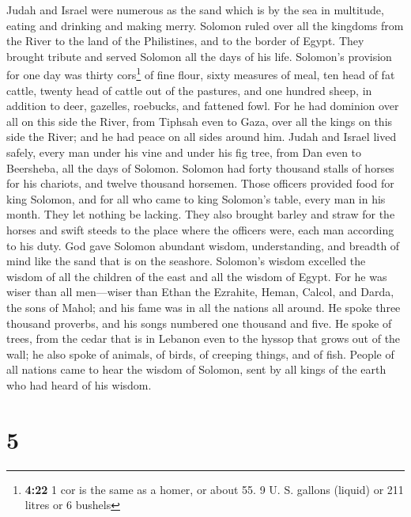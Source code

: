  Judah and Israel were numerous as the sand which is by
the sea in multitude, eating and drinking and making merry.
 Solomon ruled over all the kingdoms from the River to
the land of the Philistines, and to the border of Egypt. They brought
tribute and served Solomon all the days of his life. 
Solomon's provision for one day was thirty cors\footnote{\textbf{4:22} 1
  cor is the same as a homer, or about 55. 9 U. S. gallons (liquid) or
  211 litres or 6 bushels} of fine flour, sixty measures of meal,
 ten head of fat cattle, twenty head of cattle out of the
pastures, and one hundred sheep, in addition to deer, gazelles,
roebucks, and fattened fowl.  For he had dominion over
all on this side the River, from Tiphsah even to Gaza, over all the
kings on this side the River; and he had peace on all sides around him.
 Judah and Israel lived safely, every man under his vine
and under his fig tree, from Dan even to Beersheba, all the days of
Solomon.  Solomon had forty thousand stalls of horses for
his chariots, and twelve thousand horsemen.  Those
officers provided food for king Solomon, and for all who came to king
Solomon's table, every man in his month. They let nothing be lacking.
 They also brought barley and straw for the horses and
swift steeds to the place where the officers were, each man according to
his duty.  God gave Solomon abundant wisdom,
understanding, and breadth of mind like the sand that is on the
seashore.  Solomon's wisdom excelled the wisdom of all
the children of the east and all the wisdom of Egypt. 
For he was wiser than all men---wiser than Ethan the Ezrahite, Heman,
Calcol, and Darda, the sons of Mahol; and his fame was in all the
nations all around.  He spoke three thousand proverbs,
and his songs numbered one thousand and five.  He spoke
of trees, from the cedar that is in Lebanon even to the hyssop that
grows out of the wall; he also spoke of animals, of birds, of creeping
things, and of fish.  People of all nations came to hear
the wisdom of Solomon, sent by all kings of the earth who had heard of
his wisdom.

\hypertarget{section-4}{%
\section{5}\label{section-4}}

